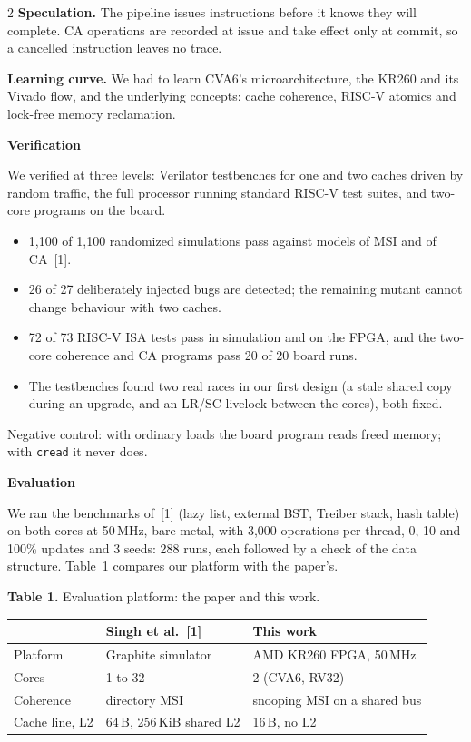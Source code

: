 \documentclass{article}
\newcommand{\smallsize}{\fontsize{14}{17.5}\selectfont}
\newcommand{\headsize}{\fontsize{30}{36}\selectfont}
\newcounter{psec}
\newcommand{\psection}[1]{%
  \par\vspace{10pt}\stepcounter{psec}%
  {\headsize\bfseries\color{navy}\thepsec\hspace{0.5em}#1\par}%
  \vspace{-3pt}{\color{navy}\rule{\columnwidth}{1.2pt}}\par\vspace{-4pt}}
\begin{document}
\begin{multicols}{2}
\textbf{Speculation.} The pipeline issues instructions before it knows they will
complete. CA operations are recorded at issue and take effect only at commit, so a
cancelled instruction leaves no trace.

\textbf{Learning curve.} We had to learn CVA6's microarchitecture, the KR260 and its
Vivado flow, and the underlying concepts: cache coherence, RISC-V atomics and lock-free
memory reclamation.

\psection{Verification}
We verified at three levels: Verilator testbenches for one and two caches driven by
random traffic, the full processor running standard RISC-V test suites, and two-core
programs on the board.
\begin{itemize}
  \item 1,100 of 1,100 randomized simulations pass against models of MSI and of CA~[1].
  \item 26 of 27 deliberately injected bugs are detected; the remaining mutant cannot
        change behaviour with two caches.
  \item 72 of 73 RISC-V ISA tests pass in simulation and on the FPGA, and the two-core
        coherence and CA programs pass 20 of 20 board runs.
  \item The testbenches found two real races in our first design (a stale shared copy
        during an upgrade, and an LR/SC livelock between the cores), both fixed.
\end{itemize}
Negative control: with ordinary loads the board program reads freed memory; with
\texttt{cread} it never does.

\psection{Evaluation}
We ran the benchmarks of~[1] (lazy list, external BST, Treiber stack, hash table) on both
cores at 50\,MHz, bare metal, with 3,000 operations per thread, 0, 10 and 100\% updates
and 3 seeds: 288 runs, each followed by a check of the data structure. Table~1 compares
our platform with the paper's.

\vspace{4pt}
{\centering
{\smallsize\color{captiongray}\textbf{Table 1.} Evaluation platform: the paper and this work.\par}
\vspace{3pt}
{\smallsize
\begin{tabular}{lll}
\toprule
 & Singh et al.~[1] & This work\\
\midrule
Platform & Graphite simulator & AMD KR260 FPGA, 50\,MHz\\
Cores & 1 to 32 & 2 (CVA6, RV32)\\
Coherence & directory MSI & snooping MSI on a shared bus\\
Cache line, L2 & 64\,B, 256\,KiB shared L2 & 16\,B, no L2\\
\bottomrule
\end{tabular}\par}}


\end{multicols}
\end{document}
